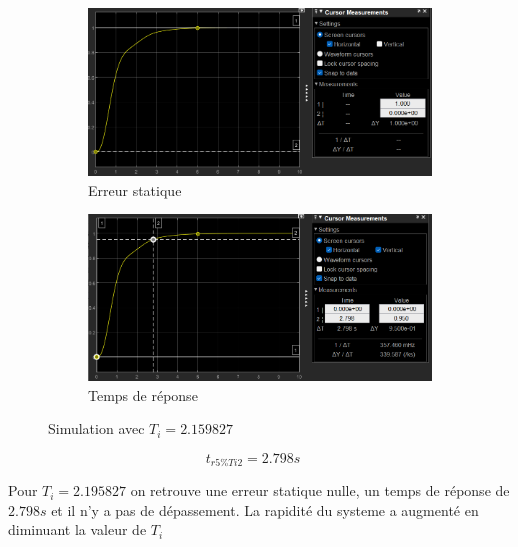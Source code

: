 \documentclass[12pt, a4paper]{report}
\begin{document}
\begin{figure}[H]
    \begin{subfigure}[h!]{0.4\linewidth}
        \includegraphics[width=\linewidth]{sim2ti2erreur.png}
        \caption{Erreur statique}
    \end{subfigure}
    \hfill    
    \begin{subfigure}[h!]{0.4\linewidth}
        \includegraphics[width=\linewidth]{sim2ti2tr.png}
        \caption{Temps de réponse}
    \end{subfigure}
    \caption{Simulation avec $T_i = 2.159827$}
    \label{fig:sim2KTi2}
\end{figure}

\[
    t_{r5\%Ti2} =   2.798s \quad
\]

Pour $T_i = 2.195827$ on retrouve une erreur statique nulle, un temps de réponse de $2.798s$ et il n'y a pas de dépassement.
La rapidité du systeme a augmenté en diminuant la valeur de $T_i$
\end{document}
